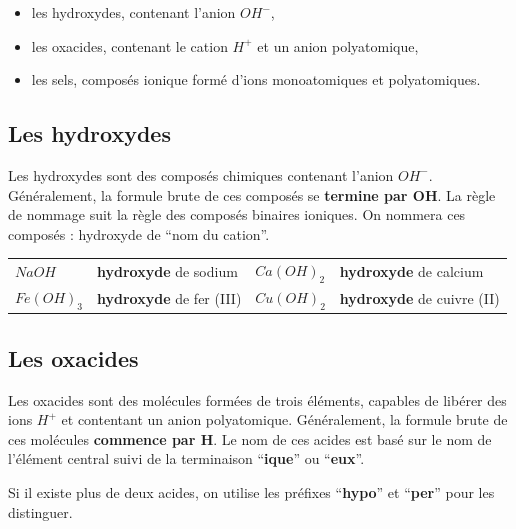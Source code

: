 \documentclass[
  11pt,
  a4paper,
  openany]{book}
\providecommand{\tightlist}{%
  \setlength{\itemsep}{0pt}\setlength{\parskip}{0pt}}
\begin{document}
\begin{itemize}
\tightlist
\item
  les hydroxydes, contenant l'anion \(OH^-\),
\item
  les oxacides, contenant le cation \(H^+\) et un anion polyatomique,
\item
  les sels, composés ionique formé d'ions monoatomiques et polyatomiques.
\end{itemize}

\subsection{Les hydroxydes}\label{les-hydroxydes}

Les hydroxydes sont des composés chimiques contenant l'anion \(OH^-\). Généralement, la formule brute de ces composés se \textbf{termine par OH}. La règle de nommage suit la règle des composés binaires ioniques. On nommera ces composés : hydroxyde de ``nom du cation''.

\begin{longtable}[]{@{}
  >{\centering\arraybackslash}p{}
  >{\raggedright\arraybackslash}p{}
  >{\centering\arraybackslash}p{}
  >{\raggedright\arraybackslash}p{}@{}}
\toprule\noalign{}
\endhead
\bottomrule\noalign{}
\endlastfoot
\(NaOH\) & \textbf{hydroxyde} de sodium & \(Ca(OH)_2\) & \textbf{hydroxyde} de calcium \\
\(Fe(OH)_3\) & \textbf{hydroxyde} de fer (III) & \(Cu(OH)_2\) & \textbf{hydroxyde} de cuivre (II) \\
\end{longtable}

\subsection{Les oxacides}\label{les-oxacides}

Les oxacides sont des molécules formées de trois éléments, capables de libérer des ions \(H^+\) et contentant un anion polyatomique. Généralement, la formule brute de ces molécules \textbf{commence par H}. Le nom de ces acides est basé sur le nom de l'élément central suivi de la terminaison ``\textbf{ique}'' ou ``\textbf{eux}''.

Si il existe plus de deux acides, on utilise les préfixes ``\textbf{hypo}'' et ``\textbf{per}'' pour les distinguer.
\end{document}
